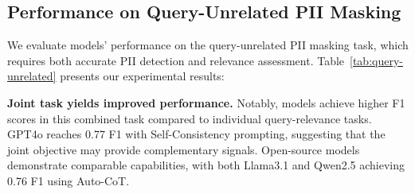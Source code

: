 \begin{table}[t]
\centering
{}
\caption{Performance comparison on challenging test sets using GPT4o.}
\label{tab:hard_distract}
\vspace{-2mm}
\end{table}

\subsection{Performance on Query-Unrelated PII Masking}
We evaluate models' performance on the query-unrelated PII masking task, which requires both accurate PII detection and relevance assessment. Table~\ref{tab:query-unrelated} presents our experimental results:

\noindent\textbf{Joint task yields improved performance.}
Notably, models achieve higher F1 scores in this combined task compared to individual query-relevance tasks. GPT4o reaches 0.77 F1 with Self-Consistency prompting, suggesting that the joint objective may provide complementary signals. Open-source models demonstrate comparable capabilities, with both Llama3.1 and Qwen2.5 achieving 0.76 F1 using Auto-CoT.

